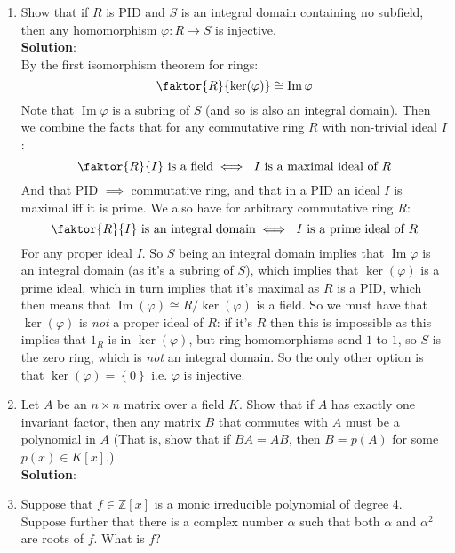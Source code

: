 \documentclass[12pt]{extarticle}
\DeclareMathOperator{\im}{Im}
\newcommand{\ZZ}{\mathbb{Z}}
\newcommand{\set}[1]{\left\{ #1  \right\}}
\begin{document}
\begin{enumerate}[1)]
    \item Show that if \(R\) is PID and \(S\) is an integral domain containing no subfield, then any homomorphism \(\varphi \colon R \to S\) is injective. \\
    
    \textbf{Solution}: \\
    By the first isomorphism theorem for rings:
    \[
    \faktor{R}{\ker(\varphi)} \cong \im \varphi
    \]
    Note that \(\im \varphi\) is a subring of \(S\) (and so is also an integral domain). Then we combine the facts that for any commutative ring \(R\) with non-trivial ideal \(I\):
    \[
    \faktor{R}{I} \text{ is a field} \iff \text{ \(I\) is a maximal ideal of \(R\)}
    \]
    And that PID \(\implies\) commutative ring, and that in a PID an ideal \(I\) is maximal iff it is prime. We also have for arbitrary commutative ring \(R\): 
    \[
    \faktor{R}{I} \text{ is an integral domain} \iff \text{ \(I\) is a prime ideal of \(R\)}
    \]
    For any proper ideal \(I\). So \(S\) being an integral domain implies that \(\im{\varphi}\) is an integral domain (as it's a subring of \(S\)), which implies that \(\ker(\varphi)\) is a prime ideal, which in turn implies that it's maximal as \(R\) is a PID, which then means that \(\im(\varphi) \cong R/\ker(\varphi)\) is a field. So we must have that \(\ker(\varphi)\) is \textit{not} a proper ideal of \(R\): if it's \(R\) then this is impossible as this implies that \(1_{R}\) is in \(\ker(\varphi)\), but ring homomorphisms send \(1\) to \(1\), so \(S\) is the zero ring, which is \textit{not} an integral domain. So the only other option is that \(\ker(\varphi) = \set{0}\) i.e. \(\varphi\) is injective.
    
    \item Let \(A\) be an \(n \times n\) matrix over a field \(K\). Show that if \(A\) has exactly one invariant factor, then any matrix \(B\) that commutes with \(A\) must be a polynomial in \(A\) (That is, show that if \(BA = AB\), then \(B = p(A)\) for some \(p(x) \in K[x]\).)\\
    
    \textbf{Solution}: \\
    
    \item Suppose that \(f \in \ZZ[x]\) is a monic irreducible polynomial of degree 4. Suppose further that there is a complex number \(\alpha\) such that both \(\alpha\) and \(\alpha^2\) are roots of \(f\). What is \(f\)?\\
    

\end{enumerate}
\end{document}
